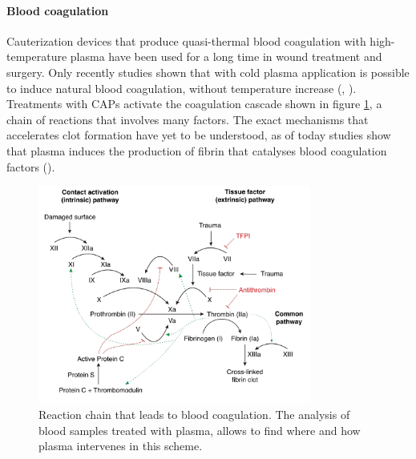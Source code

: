 \paragraph{Blood coagulation}
Cauterization devices that produce quasi-thermal blood coagulation with high-temperature plasma have been used for a long time in wound treatment and surgery. Only recently studies shown that with cold plasma application is possible to induce natural blood coagulation, without temperature increase (\cite{Fridman2006}, \cite{4343167}).
Treatments with CAPs activate the coagulation cascade shown in figure \ref{fig:coag}, a chain of reactions that involves many factors. The exact mechanisms that accelerates clot formation have yet to be understood, as of today studies show that plasma induces the production of fibrin that catalyses blood coagulation factors (\cite{plmed_review}).
\begin{figure}
 \centering
 \includegraphics[width=0.8\textwidth]{Images/Intro/coag_map.png}
 \caption{Reaction chain that leads to blood coagulation. The analysis of blood samples treated with plasma, allows to find where and how plasma intervenes in this scheme.}
 \label{fig:coag}
\end{figure}


